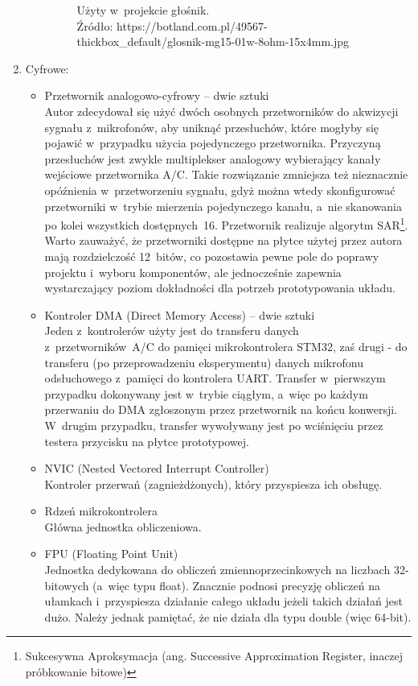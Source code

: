 \begin{enumerate}
\begin{itemize}
\begin{figure}[h!]
			\caption{Użyty w~projekcie głośnik.\\ Źródło: https://botland.com.pl/49567-thickbox\_default/glosnik-mg15-01w-8ohm-15x4mm.jpg}
			\label{fig:mg15}
		\end{figure}
	\end{itemize}
	\item Cyfrowe:
	\begin{itemize}
		\item Przetwornik analogowo-cyfrowy -- dwie sztuki\\
		Autor zdecydował się użyć dwóch osobnych przetworników do akwizycji sygnału z~mikrofonów, aby uniknąć przesłuchów, które mogłyby się pojawić w~przypadku użycia pojedynczego przetwornika. Przyczyną przesłuchów jest zwykle multiplekser analogowy wybierający kanały wejściowe przetwornika A/C. Takie rozwiązanie zmniejsza też nieznacznie opóźnienia w~przetworzeniu sygnału, gdyż można wtedy skonfigurować przetworniki w~trybie mierzenia pojedynczego kanału, a~nie skanowania po kolei wszystkich dostępnych~16. Przetwornik realizuje algorytm SAR\footnote{Sukcesywna Aproksymacja (ang. Successive Approximation Register, inaczej próbkowanie bitowe)}.\\
		Warto zauważyć, że przetworniki dostępne na płytce użytej przez autora mają rozdzielczość 12~bitów, co pozostawia pewne pole do poprawy projektu i~wyboru komponentów, ale jednocześnie zapewnia wystarczający poziom dokładności dla potrzeb prototypowania układu.
		\item Kontroler DMA (Direct Memory Access) -- dwie sztuki\\
		Jeden z~kontrolerów użyty jest do transferu danych z~przetworników~A/C do pamięci mikrokontrolera STM32, zaś drugi - do transferu (po przeprowadzeniu eksperymentu) danych mikrofonu odsłuchowego z~pamięci do kontrolera UART. Transfer w~pierwszym przypadku dokonywany jest w~trybie ciągłym, a~więc po każdym przerwaniu do DMA zgłoszonym przez przetwornik na końcu konwersji. W~drugim przypadku, transfer wywoływany jest po wciśnięciu przez testera przycisku na płytce prototypowej.
		\item NVIC (Nested Vectored Interrupt Controller)\\
		Kontroler przerwań (zagnieżdżonych), który przyspiesza ich obsługę.
		\item Rdzeń mikrokontrolera\\
		Główna jednostka obliczeniowa.
		\item FPU (Floating Point Unit)\\
		Jednostka dedykowana do obliczeń zmiennoprzecinkowych na liczbach 32-bitowych (a~więc typu float). Znacznie podnosi precyzję obliczeń na ułamkach i~przyspiesza działanie całego układu jeżeli takich działań jest dużo. Należy jednak pamiętać, że nie działa dla typu double (więc 64-bit). 

\end{itemize}
\end{enumerate}
